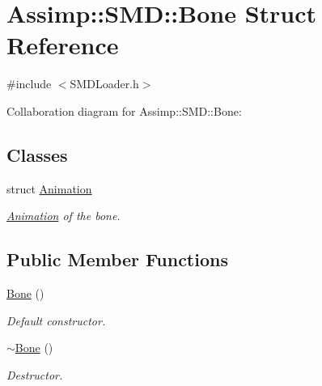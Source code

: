 \hypertarget{struct_assimp_1_1_s_m_d_1_1_bone}{\section{Assimp\+:\+:S\+M\+D\+:\+:Bone Struct Reference}
\label{struct_assimp_1_1_s_m_d_1_1_bone}
}


{\ttfamily \#include $<$S\+M\+D\+Loader.\+h$>$}



Collaboration diagram for Assimp\+:\+:S\+M\+D\+:\+:Bone\+:
\subsection*{Classes}
\begin{DoxyCompactItemize}
\item 
struct \hyperlink{struct_assimp_1_1_s_m_d_1_1_bone_1_1_animation}{Animation}
\begin{DoxyCompactList}\small\item\em \hyperlink{struct_assimp_1_1_s_m_d_1_1_bone_1_1_animation}{Animation} of the bone. \end{DoxyCompactList}\end{DoxyCompactItemize}
\subsection*{Public Member Functions}
\begin{DoxyCompactItemize}
\item 
\hypertarget{struct_assimp_1_1_s_m_d_1_1_bone_a09d0d2638120895d90c0169e255b2041}{\hyperlink{struct_assimp_1_1_s_m_d_1_1_bone_a09d0d2638120895d90c0169e255b2041}{Bone} ()}\label{struct_assimp_1_1_s_m_d_1_1_bone_a09d0d2638120895d90c0169e255b2041}

\begin{DoxyCompactList}\small\item\em Default constructor. \end{DoxyCompactList}\item 
\hypertarget{struct_assimp_1_1_s_m_d_1_1_bone_a95566a42a8fa6ea77bb54642f221bf1b}{\hyperlink{struct_assimp_1_1_s_m_d_1_1_bone_a95566a42a8fa6ea77bb54642f221bf1b}{$\sim$\+Bone} ()}\label{struct_assimp_1_1_s_m_d_1_1_bone_a95566a42a8fa6ea77bb54642f221bf1b}

\begin{DoxyCompactList}\small\item\em Destructor. \end{DoxyCompactList}\end{DoxyCompactItemize}
